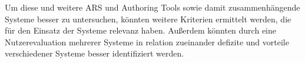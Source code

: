 \documentclass[conference]{IEEEtran}
\begin{document}
Um diese und weitere ARS und Authoring Tools sowie damit zusammenhängende Systeme besser zu untersuchen, könnten weitere Kriterien ermittelt werden, die für den Einsatz der Systeme relevanz haben. Außerdem könnten durch eine Nutzerevaluation mehrerer Systeme in relation zueinander defizite und vorteile verschiedener Systeme besser identifiziert werden.







%
%
\end{document}
